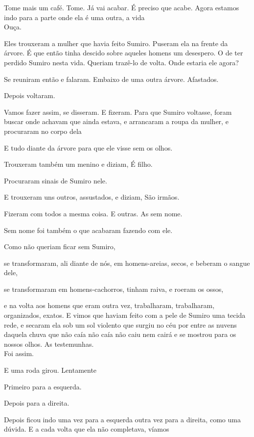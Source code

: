 Tome mais um café. Tome. Já vai acabar. É preciso que acabe. Agora
estamos indo para a parte onde ela é uma outra, a vida\\

Ouça.

Eles trouxeram a mulher que havia feito Sumiro. Puseram ela na frente da
árvore. É que então tinha descido sobre aqueles homens um desespero. O
de ter perdido Sumiro nesta vida. Queriam trazê-lo de volta. Onde
estaria ele agora?

Se reuniram então e falaram. Embaixo de uma outra árvore. Afastados.

Depois voltaram.

Vamos fazer assim, se disseram. E fizeram. Para que Sumiro voltasse,
foram buscar onde achavam que ainda estava, e arrancaram a roupa da
mulher, e procuraram no corpo dela

E tudo diante da árvore para que ele visse sem os olhos.

Trouxeram também um menino e diziam, É filho.

Procuraram sinais de Sumiro nele.

E trouxeram uns outros, assustados, e diziam, São irmãos.

Fizeram com todos a mesma coisa. E outras. As sem nome.

Sem nome foi também o que acabaram fazendo com ele.

Como não queriam ficar sem Sumiro,

se transformaram, ali diante de nós, em homens-areias, secos, e beberam
o sangue dele,

se transformaram em homens-cachorros, tinham raiva, e roeram os ossos,

e na volta aos homens que eram outra vez, trabalharam, trabalharam,
organizados, exatos. E vimos que haviam feito com a pele de Sumiro uma
tecida rede, e secaram ela sob um sol violento que surgiu no céu por
entre as nuvens daquela chuva que não caía não caía não caiu nem cairá e
se mostrou para os nossos olhos. As testemunhas.\\

Foi assim.

E uma roda girou. Lentamente

Primeiro para a esquerda.

Depois para a direita.

Depois ficou indo uma vez para a esquerda outra vez para a direita, como
uma dúvida. E a cada volta que ela não completava, víamos

